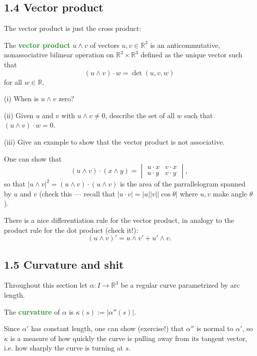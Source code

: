 \documentclass[10pt]{scrartcl}
\providecommand{\RR}{\mathbb R}
\providecommand{\vocab}[1]{{\textbf{\textcolor{ForestGreen}{#1}}}}
\begin{document}
\subsection{1.4 Vector product}
The vector product is just the cross product:
\begin{definition}
	The \vocab{vector product} $u\wedge v$ of vectors $u,v\in\RR^3$ is
	an anticommutative, nonassociative bilinear operation on $\RR^3\times\RR^3$
	defined as the unique vector such that
	\[(u\wedge v)\cdot w = \det(u, v, w)\]
	for all $w\in\RR$.
\end{definition}

\begin{exercise}
	(i) When is $u\wedge v$ zero?
	
	(ii) Given $u$ and $v$ with $u\wedge v\ne 0$,
	describe the set of all $w$ such that $(u\wedge v)\cdot w = 0$.
	
	(iii) Give an example to show that the vector product
	is not associative.
\end{exercise}

One can show that
\[(u\wedge v)\cdot (x\wedge y) = \begin{vmatrix}
	u\cdot x&v\cdot x\\ u\cdot y&v\cdot y
\end{vmatrix},\]
so that $|u\wedge v|^2 = (u\wedge v)\cdot(u\wedge v)$ is the area
of the parrallelogram spanned by $u$ and $v$ (check this ---
recall that $|u\cdot v| = |u||v||\cos\theta|$ where $u,v$ make angle $\theta$).

There is a nice differentiation rule for the vector product,
in analogy to the product rule for the dot product (check it!):
\[(u\wedge v)' = u\wedge v' + u'\wedge v.\]

\subsection{1.5 Curvature and shit}
Throughout this section let $\alpha\colon I\to\RR^3$ be a regular curve
parametrized by arc length.

\begin{definition}[Curvature]
	The \vocab{curvature} of $\alpha$ is $\kappa(s) := |\alpha''(s)|$.
\end{definition}

Since $\alpha'$ has constant length, one can show (exercise!)
that $\alpha''$ is normal to $\alpha'$, so $\kappa$ is a measure of
how quickly the curve is pulling away from its tangent vector,
i.e. how sharply the curve is turning at $s$.
\end{document}
